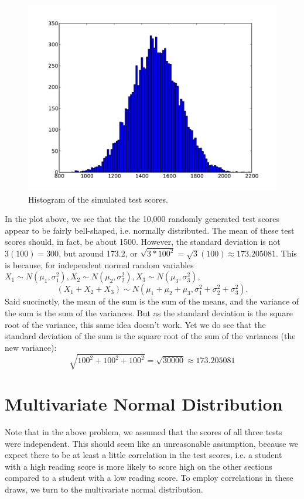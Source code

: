 \begin{figure}[h]
\centering
\includegraphics[width=\textwidth]{scorehist.pdf}
\caption{Histogram of the simulated test scores.}
\end{figure}

In the plot above, we see that the the 10,000 randomly generated test scores appear to be fairly bell-shaped, i.e. normally distributed. 
The mean of these test scores should, in fact, be about 1500. 
However, the standard deviation is not $3(100) = 300$, but around 173.2, or $\sqrt{3*100^2}=\sqrt{3}(100) \approx 173.205081$. 
This is because, for independent normal random variables $X_1 \sim N(\mu_1,\sigma^2_1), X_2 \sim N(\mu_2,\sigma^2_2),X_3 \sim N(\mu_3,\sigma^2_3),$
 $$ (X_1 +X_2 +X_3) \sim N(\mu_1+\mu_2+\mu_3, \sigma^2_1+\sigma^2_2+\sigma^2_3).$$
Said succinctly, the mean of the sum is the sum of the means, and the variance of the sum is the sum of the variances. 
But as the standard deviation is the square root of the variance, this same idea doesn't work. 
Yet we do see that the standard deviation of the sum is the square root of the sum of the variances (the new variance):
 $$\sqrt{100^2+100^2+100^2} = \sqrt{30000} \approx 173.205081$$

\section*{Multivariate Normal Distribution}
Note that in the above problem, we assumed that the scores of all three tests were independent. 
This should seem like an unreasonable assumption, because we expect there to be at least a little correlation in the test scores, 
i.e. a student with a high reading score is more likely to score high on the other sections compared to a student with a low reading score. 
To employ correlations in these draws, we turn to the multivariate normal distribution. 
 
